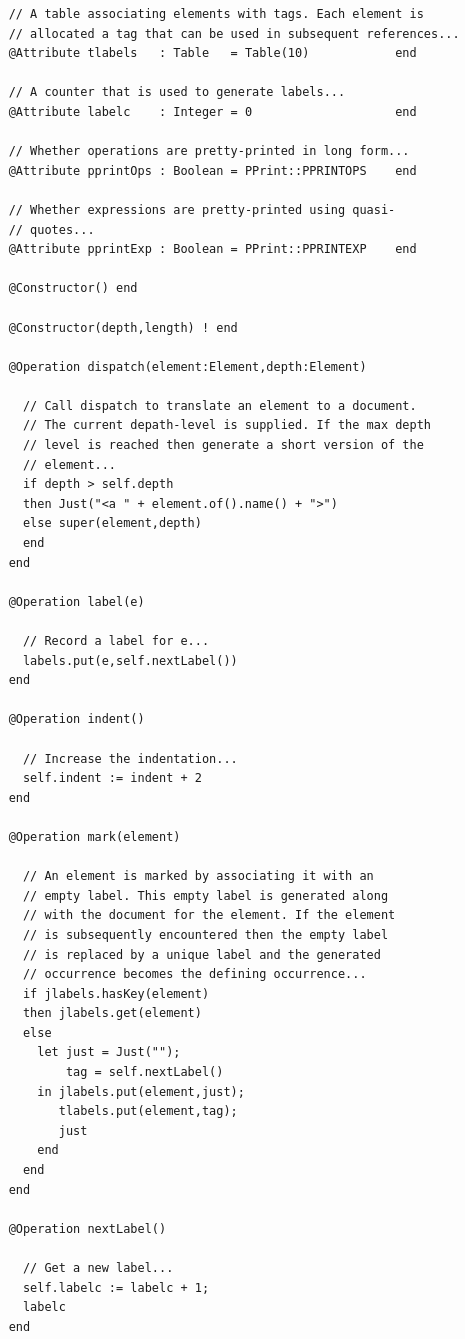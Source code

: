 \begin{lstlisting}
    // A table associating elements with tags. Each element is
    // allocated a tag that can be used in subsequent references...
    @Attribute tlabels   : Table   = Table(10)            end
    
    // A counter that is used to generate labels...
    @Attribute labelc    : Integer = 0                    end
    
    // Whether operations are pretty-printed in long form...
    @Attribute pprintOps : Boolean = PPrint::PPRINTOPS    end
    
    // Whether expressions are pretty-printed using quasi-
    // quotes...
    @Attribute pprintExp : Boolean = PPrint::PPRINTEXP    end
    
    @Constructor() end
    
    @Constructor(depth,length) ! end
    
    @Operation dispatch(element:Element,depth:Element)
    
      // Call dispatch to translate an element to a document.
      // The current depath-level is supplied. If the max depth
      // level is reached then generate a short version of the 
      // element...
      if depth > self.depth
      then Just("<a " + element.of().name() + ">")
      else super(element,depth)
      end
    end
    
    @Operation label(e)
    
      // Record a label for e...
      labels.put(e,self.nextLabel())
    end
    
    @Operation indent()
    
      // Increase the indentation...
      self.indent := indent + 2
    end
    
    @Operation mark(element)
    
      // An element is marked by associating it with an
      // empty label. This empty label is generated along
      // with the document for the element. If the element
      // is subsequently encountered then the empty label 
      // is replaced by a unique label and the generated
      // occurrence becomes the defining occurrence...
      if jlabels.hasKey(element)
      then jlabels.get(element)
      else
        let just = Just("");
            tag = self.nextLabel()
        in jlabels.put(element,just);
           tlabels.put(element,tag);
           just
        end
      end
    end
    
    @Operation nextLabel()
    
      // Get a new label...
      self.labelc := labelc + 1;
      labelc
    end
    

\end{lstlisting}
